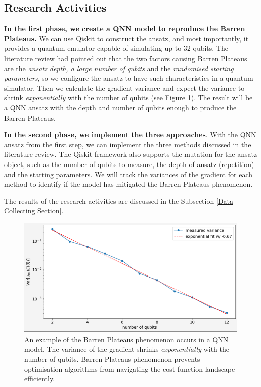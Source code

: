 \subsection{Research Activities}

\textbf{In the first phase, we create a QNN model to reproduce the Barren Plateaus.} 
We can use Qiskit \cite{Qiskit} to construct the ansatz, and most importantly, it provides a quantum emulator capable of simulating up to 32 qubits.
The literature review had pointed out that the two factors causing Barren Plateaus are the \textit{ansatz depth, a large number of qubits} and the \textit{randomised starting parameters}, so we configure the ansatz to have such characteristics in a quantum simulator.
Then we calculate the gradient variance and expect the variance to shrink \textit{exponentially} with the number of qubits (see Figure \ref{Variance Shrinking demo}).
The result will be a QNN ansatz with the depth and number of qubits enough to produce the Barren Plateaus.

\textbf{In the second phase, we implement the three approaches}.
With the QNN ansatz from the first step, we can implement the three methods discussed in the literature review.
The Qiskit framework also supports the mutation for the ansatz object, such as the number of qubits to measure, the depth of ansatz (repetition) and the starting parameters.
We will track the variances of the gradient for each method to identify if the model has mitigated the Barren Plateaus phenomenon.

The results of the research activities are discussed in the Subsection \ref{Data Collecting Section}.

\label{Research Activities section}
\begin{figure}
    \includegraphics[width=\textwidth]{./ResearchDesign/Appendices/VarianceShrinking.png}
    \caption{
        An example of the Barren Plateaus phenomenon occurs in a QNN model. 
        The variance of the gradient shrinks \textit{exponentially} with the number of qubits. 
        Barren Plateaus phenomenon prevents optimisation algorithms from navigating the cost function landscape efficiently.
    }
    \label{Variance Shrinking demo}
\end{figure}



